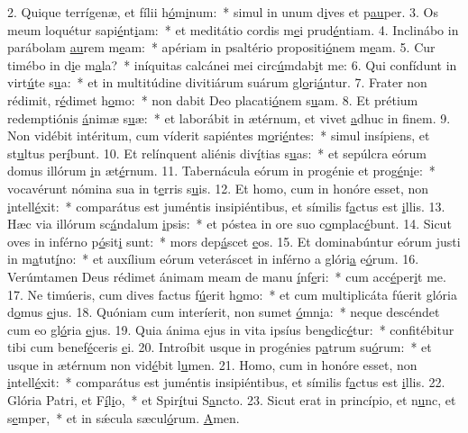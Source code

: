 2. Quique terrígenæ, et fílii h\uline{ó}m\uline{i}num:~* simul in unum d\uline{i}ves et p\uline{au}per.
3. Os meum loquétur sapi\uline{é}nt\uline{i}am:~* et meditátio cordis m\uline{e}i prud\uline{é}ntiam.
4. Inclinábo in parábolam \uline{au}rem m\uline{e}am:~* apériam in psaltério propositi\uline{ó}nem m\uline{e}am.
5. Cur timébo in d\uline{i}e m\uline{a}la?~* iníquitas calcánei mei circ\uline{ú}mdab\uline{i}t me:
6. Qui confídunt in virt\uline{ú}te s\uline{u}a:~* et in multitúdine divitiárum suárum gl\uline{o}ri\uline{á}ntur.
7. Frater non rédimit, r\uline{é}dimet h\uline{o}mo:~* non dabit Deo placati\uline{ó}nem s\uline{u}am.
8. Et prétium redemptiónis \uline{á}nimæ s\uline{u}æ:~* et laborábit in ætérnum, et vivet \uline{a}dhuc in f\uline{i}nem.
9. Non vidébit intéritum, cum víderit sapiéntes m\uline{o}ri\uline{é}ntes:~* simul insípiens, et st\uline{u}ltus per\uline{í}bunt.
10. Et relínquent aliénis div\uline{í}tias s\uline{u}as:~* et sepúlcra eórum domus illórum \uline{i}n æt\uline{é}rnum.
11. Tabernácula eórum in progénie et prog\uline{é}n\uline{i}e:~* vocavérunt nómina sua in t\uline{e}rris s\uline{u}is.
12. Et homo, cum in honóre esset, non \uline{i}ntell\uline{é}xit:~* comparátus est juméntis insipiéntibus, et símilis f\uline{a}ctus est \uline{i}llis.
13. Hæc via illórum sc\uline{á}ndalum \uline{i}psis:~* et póstea in ore suo c\uline{o}mplac\uline{é}bunt.
14. Sicut oves in inférno p\uline{ó}sit\uline{i} sunt:~* mors dep\uline{á}scet \uline{e}os.
15. Et dominabúntur eórum justi in m\uline{a}tut\uline{í}no:~* et auxílium eórum veteráscet in inférno a glóri\uline{a} e\uline{ó}rum.
16. Verúmtamen Deus rédimet ánimam meam de manu \uline{í}nf\uline{e}ri:~* cum acc\uline{é}per\uline{i}t me.
17. Ne timúeris, cum dives factus f\uline{ú}erit h\uline{o}mo:~* et cum multiplicáta fúerit glória d\uline{o}mus \uline{e}jus.
18. Quóniam cum interíerit, non sumet \uline{ó}mn\uline{i}a:~* neque descéndet cum eo gl\uline{ó}ria \uline{e}jus.
19. Quia ánima ejus in vita ipsíus ben\uline{e}dic\uline{é}tur:~* confitébitur tibi cum benef\uline{é}ceris \uline{e}i.
20. Introíbit usque in progénies p\uline{a}trum su\uline{ó}rum:~* et usque in ætérnum non vid\uline{é}bit l\uline{u}men.
21. Homo, cum in honóre esset, non \uline{i}ntell\uline{é}xit:~* comparátus est juméntis insipiéntibus, et símilis f\uline{a}ctus est \uline{i}llis.
22. Glória Patri, et F\uline{í}l\uline{i}o,~* et Spir\uline{í}tui S\uline{a}ncto.
23. Sicut erat in princípio, et n\uline{u}nc, et s\uline{e}mper,~* et in sǽcula sæcul\uline{ó}rum. \uline{A}men.
